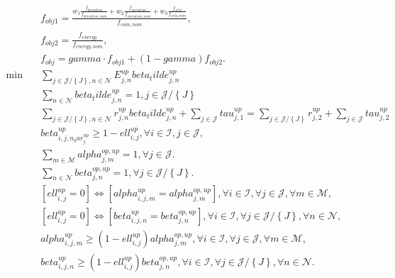 \begin{align}
  & f_{obj 1} = \frac{w_{1} \frac{f_{deviation}}{f_{deviation , nom}} + w_{2} \frac{f_{variation}}{f_{variation , nom}} + w_{3} \frac{f_{\mathit{zeta}}}{f_{\mathit{zeta} , nom}}}{f_{sum , nom}} , \tag{eq\_0028} \\
  & f_{obj 2} = \frac{f_{energy}}{f_{energy , nom}} , \tag{eq\_0029} \\
  & f_{obj} = \mathit{gamma} \cdot f_{obj 1} + \left(1 - \mathit{gamma}\right) f_{obj 2} . \tag{eq\_0030} \\
  \min\quad & \sum_{j \in \mathcal{J} / \left\{J\right\}, n \in \mathcal{N}} E_{j , n}^{up} beta_tilde_{j , n}^{up} \tag{eq\_0031\_a} \\
  & \sum_{n \in \mathcal{N}} beta_tilde_{j , n}^{up} = 1 , j \in \mathcal{J} / \left\{J\right\} \tag{eq\_0031\_b} \\
  & \sum_{j \in \mathcal{J} / \left\{J\right\}, n \in \mathcal{N}} r_{j , n}^{up} beta_tilde_{j , n}^{up} + \sum_{j \in \mathcal{J}} \mathit{tau}_{j , 1}^{up} = \sum_{j \in \mathcal{J} / \left\{J\right\}} r_{j , 2}^{up} + \sum_{j \in \mathcal{J}} \mathit{tau}_{j , 2}^{up} \tag{eq\_0031\_c} \\
  & \mathit{beta}_{i , j , n_bar_{j}^{up}}^{up} \geq 1 - \mathit{ell}_{i , j}^{up} , \forall i \in \mathcal{I} , j \in \mathcal{J} , \tag{eq\_0032} \\
  & \sum_{m \in \mathcal{M}} \mathit{alpha}_{j , m}^{op , up} = 1 , \forall j \in \mathcal{J} . \tag{eq\_0033} \\
  & \sum_{n \in \mathcal{N}} \mathit{beta}_{j , n}^{op , up} = 1 , \forall j \in \mathcal{J} / \left\{J\right\} . \tag{eq\_0034} \\
  & \left[\mathit{ell}_{i , j}^{up} = 0\right] \Leftrightarrow \left[\mathit{alpha}_{i , j , m}^{up} = \mathit{alpha}_{j , m}^{op , up}\right] , \forall i \in \mathcal{I} , \forall j \in \mathcal{J} , \forall m \in \mathcal{M} , \tag{eq\_0035} \\
  & \left[\mathit{ell}_{i , j}^{up} = 0\right] \Leftrightarrow \left[\mathit{beta}_{i , j , n}^{up} = \mathit{beta}_{j , n}^{op , up}\right] , \forall i \in \mathcal{I} , \forall j \in \mathcal{J} / \left\{J\right\} , \forall n \in \mathcal{N} , \tag{eq\_0036} \\
  & \mathit{alpha}_{i , j , m}^{up} \geq \left(1 - \mathit{ell}_{i , j}^{up}\right) \mathit{alpha}_{j , m}^{op , up} , \forall i \in \mathcal{I} , \forall j \in \mathcal{J} , \forall m \in \mathcal{M} , \tag{eq\_0037} \\
  & \mathit{beta}_{i , j , n}^{up} \geq \left(1 - \mathit{ell}_{i , j}^{up}\right) \mathit{beta}_{j , n}^{op , up} , \forall i \in \mathcal{I} , \forall j \in \mathcal{J} / \left\{J\right\} , \forall n \in \mathcal{N} . \tag{eq\_0038} \\

\end{align}
